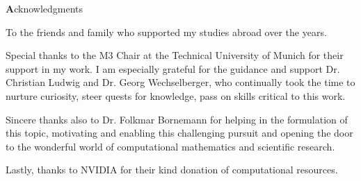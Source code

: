 \clearemptydoublepage
{}
{}



\vspace*{2cm}

\begin{center}
{\Large \textbf Acknowledgments}
\end{center}

\vspace{1cm}



\begin{center}
To the friends and family who supported my studies abroad over the years.
\newline
\newline

Special thanks to the M3 Chair at the Technical University of Munich for their support in my work.
I am especially grateful for the guidance and support Dr. Christian Ludwig and Dr. Georg Wechselberger,
who continually took the time to nurture curiosity, steer quests for knowledge,
pass on skills critical to this work.
\newline
\newline

Sincere thanks also to Dr. Folkmar Bornemann for helping in the formulation of this topic,
motivating and enabling this challenging pursuit and opening the door to the wonderful world of
 computational mathematics and scientific research.
\newline
\newline
\newline

Lastly, thanks to NVIDIA for their kind donation of computational resources.
\end{center}
